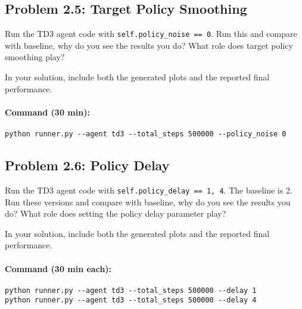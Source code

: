 \documentclass[12pt]{article}
\begin{document}
\begin{solution}[height=5cm]
\end{solution}

\subsection*{Problem 2.5: Target Policy Smoothing}

Run the TD3 agent code with \texttt{self.policy_noise == 0}. Run this and compare with baseline, why do you see the results you do? What role does target policy smoothing play? 

In your solution, include both the generated plots and the reported final performance.

\paragraph{Command (30 min):}
\begin{verbatim}
python runner.py --agent td3 --total_steps 500000 --policy_noise 0
\end{verbatim}

\begin{solution}[height=5cm]
\end{solution}

\subsection*{Problem 2.6: Policy Delay}

Run the TD3 agent code with \texttt{self.policy_delay == 1, 4}. The baseline is 2. Run these versions and compare with baseline, why do you see the results you do? What role does setting the policy delay parameter play? 

In your solution, include both the generated plots and the reported final performance.

\paragraph{Command (30 min each):}
\begin{verbatim}
python runner.py --agent td3 --total_steps 500000 --delay 1
python runner.py --agent td3 --total_steps 500000 --delay 4
\end{verbatim}

\begin{solution}[height=5cm]
\end{solution}
\end{document}
